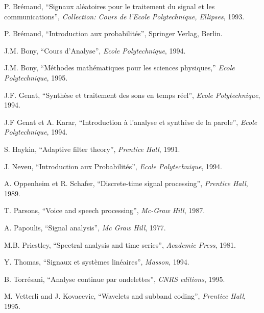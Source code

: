 \begin{thebibliography}{99}

 P. Br\'emaud,
``Signaux al\'eatoires pour le traitement du signal et les communications'',
{\em Collection: Cours de l'Ecole Polytechnique, Ellipses}, 1993.

 P. Br\'emaud,
``Introduction aux probabilit\'es'', Springer Verlag, Berlin.

 J.M. Bony,
``Cours d'Analyse'',
{\em Ecole Polytechnique}, 1994.

 J.M. Bony,
``M\'ethodes math\'ematiques pour les sciences physiques,''
{\em Ecole Polytechnique}, 1995.

 J.F. Genat,
``Synth\`ese et traitement des sons en temps r\'eel'',
{\em Ecole Polytechnique}, 1994.

 J.F Genat et A. Karar,
``Introduction \`a l'analyse et synth\`ese de la parole'',
{\em Ecole Polytechnique}, 1994.

 S. Haykin,
``Adaptive filter theory'',
{\em Prentice Hall}, 1991.

 J. Neveu,
``Introduction aux Probabilit\'es'',
{\em Ecole Polytechnique}, 1994.

 A. Oppenheim et R. Schafer,
``Discrete-time signal processing'',
{\em Prentice Hall}, 1989. 

 T. Parsons,
``Voice and speech processing'',
{\em Mc-Graw Hill}, 1987.

 A. Papoulis,
``Signal analysis'',
{\em Mc Graw Hill}, 1977.

 M.B. Priestley,
``Spectral analysis and time series'',
{\em Academic Press}, 1981.

 Y. Thomas,
``Signaux et syst\`emes lin\'eaires'',
{\em Masson}, 1994.

 B. Torr\'esani,
``Analyse continue par ondelettes'',
{\em CNRS editions}, {1995}.

 M. Vetterli and J. Kovacevic, 
``Wavelets and subband coding'',
{\em Prentice Hall}, 1995.

\end{thebibliography}